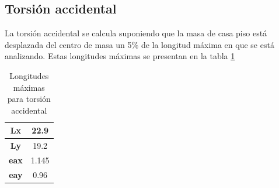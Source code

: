 \documentclass[12pt]{article}
\begin{document}
\subsection{Torsión accidental}

La torsión accidental se calcula suponiendo que la masa de casa piso está desplazada del centro de masa un 5\% de la longitud máxima en que se está analizando. Estas longitudes máximas se presentan en la tabla \ref{tab:LMAX_TA}

\begin{table}[h]
  \centering
 
    \begin{tabular}{|c|c|}
    \hline
    \rowcolor[rgb]{ .2,  .247,  .31} \textcolor[rgb]{ 1,  1,  1}{\textbf{Lx}} & \cellcolor[rgb]{ 1,  1,  1}22.9 \bigstrut\\
    \hline
    \rowcolor[rgb]{ .2,  .247,  .31} \textcolor[rgb]{ 1,  1,  1}{\textbf{Ly}} & \cellcolor[rgb]{ 1,  1,  1}19.2 \bigstrut\\
    \hline
    \rowcolor[rgb]{ .2,  .247,  .31} \textcolor[rgb]{ 1,  1,  1}{\textbf{eax}} & \cellcolor[rgb]{ 1,  1,  1}1.145 \bigstrut\\
    \hline
    \rowcolor[rgb]{ .2,  .247,  .31} \textcolor[rgb]{ 1,  1,  1}{\textbf{eay}} & \cellcolor[rgb]{ 1,  1,  1}0.96 \bigstrut\\
    \hline
    \end{tabular}%
     \caption{Longitudes máximas para torsión accidental}
  \label{tab:LMAX_TA}%
\end{table}%
\end{document}
